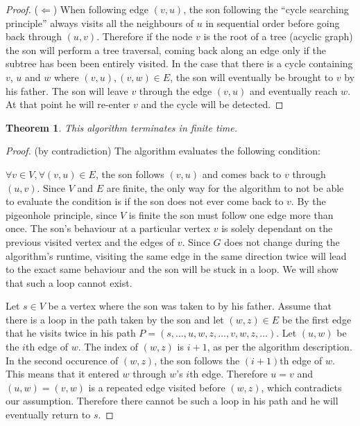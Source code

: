 \documentclass{article}
\newtheorem{theorem}{Theorem}
\begin{document}
\begin{enumerate}
\begin{proof}
($\Longleftarrow$) When following edge $(v,u)$, the son following the ``cycle searching principle'' always visits all the neighbours of $u$ in sequential order before going back through $(u,v)$. Therefore if the node $v$ is the root of a tree (acyclic graph) the son will perform a tree traversal, coming back along an edge only if the subtree has been been entirely visited. In the case that there is a cycle containing $v$, $u$ and $w$ where $(v,u),(v,w)\in E$, the son will eventually be brought to $v$ by his father. The son will leave $v$ through the edge $(v,u)$ and eventually reach $w$. At that point he will re-enter $v$ and the cycle will be detected.
\end{proof}
\begin{theorem}This algorithm terminates in finite time.\end{theorem}
\begin{proof} (by contradiction) The algorithm evaluates the following condition:

$\forall v\in V, \forall (v,u)\in E$, the son follows $(v,u)$ and comes back to $v$ through $(u,v)$. Since $V$ and $E$ are finite, the only way for the algorithm to not be able to evaluate the condition is if the son does not ever come back to $v$. By the pigeonhole principle, since $V$ is finite the son must follow one edge more than once. The son's behaviour at a particular vertex $v$ is solely dependant on the previous visited vertex and the edges of $v$. Since $G$ does not change during the algorithm's runtime, visiting the same edge in the same direction twice will lead to the exact same behaviour and the son will be stuck in a loop. We will show that such a loop cannot exist.

Let $s\in V$ be a vertex where the son was taken to by his father. Assume that there is a loop in the path taken by the son and let $(w,z)\in E$ be the first edge that he visits twice in his path $P=(s,\dotsc,u,w,z,\dotsc,v,w,z,\dotsc)$. Let $(u,w)$ be the $i$th edge of $w$. The index of $(w,z)$ is $i+1$, as per the algorithm description. In the second occurence of $(w,z)$, the son follows the $(i+1)$th edge of $w$. This means that it entered $w$ through $w$'s $i$th edge. Therefore $u=v$ and $(u,w)=(v,w)$ is a repeated edge visited before $(w,z)$, which contradicts our assumption. Therefore there cannot be such a loop in his path and he will eventually return to $s$.
\end{proof}


\end{enumerate}
\end{document}
